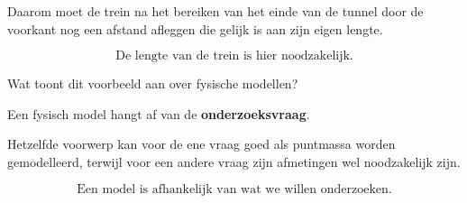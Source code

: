 \documentclass{ximera}
\begin{document}
\begin{oefening}{\oefB\ESS}
\begin{question}
\begin{oplossing}
  Daarom moet de trein na het bereiken van het einde van de tunnel door de
  voorkant nog een afstand afleggen die gelijk is aan zijn eigen lengte.
  
  \[
  \boxed{\text{De lengte van de trein is hier noodzakelijk.}}
  \]
  \end{oplossing}
  \end{question}
  
  
  \begin{question}
  Wat toont dit voorbeeld aan over fysische modellen?
  
  \begin{oplossing}
  Een fysisch model hangt af van de \textbf{onderzoeksvraag}.
  
  Hetzelfde voorwerp kan voor de ene vraag goed als puntmassa worden
  gemodelleerd, terwijl voor een andere vraag zijn afmetingen wel noodzakelijk
  zijn.
  
  \[
  \boxed{\text{Een model is afhankelijk van wat we willen onderzoeken.}}
  \]
  \end{oplossing}
  \end{question}
  
  \end{oefening}
  
  
  
\end{document}

